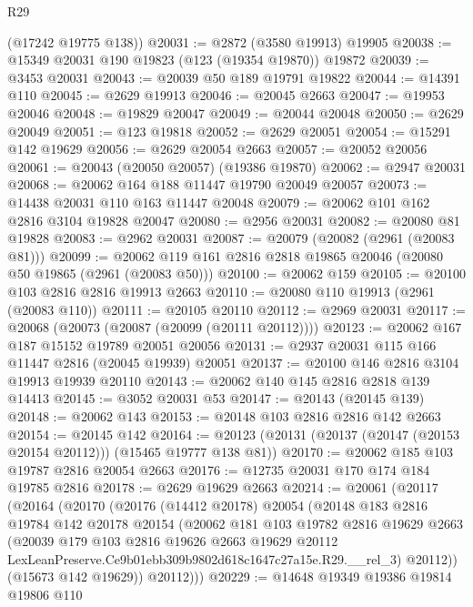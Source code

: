 \begin{lexlean}{R29}
\begin{coremodule}
      (@17242 @19775 @138))
@20031 := @2872 (@3580 @19913) @19905
@20038 := @15349 @20031 @190 @19823 (@123 (@19354 @19870)) @19872
@20039 := @3453 @20031
@20043 := @20039 @50 @189 @19791 @19822
@20044 := @14391 @110
@20045 := @2629 @19913
@20046 := @20045 @2663
@20047 := @19953 @20046
@20048 := @19829 @20047
@20049 := @20044 @20048
@20050 := @2629 @20049
@20051 := @123 @19818
@20052 := @2629 @20051
@20054 := @15291 @142 @19629
@20056 := @2629 @20054 @2663
@20057 := @20052 @20056
@20061 := @20043 (@20050 @20057) (@19386 @19870)
@20062 := @2947 @20031
@20068 := @20062 @164 @188 @11447 @19790 @20049 @20057
@20073 := @14438 @20031 @110 @163 @11447 @20048
@20079 := @20062 @101 @162 @2816 @3104 @19828 @20047
@20080 := @2956 @20031
@20082 := @20080 @81 @19828
@20083 := @2962 @20031
@20087 := @20079 (@20082 (@2961 (@20083 @81)))
@20099 := @20062 @119 @161 @2816 @2818 @19865 @20046 (@20080 @50 @19865 (@2961 (@20083 @50)))
@20100 := @20062 @159
@20105 := @20100 @103 @2816 @2816 @19913 @2663
@20110 := @20080 @110 @19913 (@2961 (@20083 @110))
@20111 := @20105 @20110
@20112 := @2969 @20031
@20117 := @20068 (@20073 (@20087 (@20099 (@20111 @20112))))
@20123 := @20062 @167 @187 @15152 @19789 @20051 @20056
@20131 := @2937 @20031 @115 @166 @11447 @2816 (@20045 @19939) @20051
@20137 := @20100 @146 @2816 @3104 @19913 @19939 @20110
@20143 := @20062 @140 @145 @2816 @2818 @139 @14413
@20145 := @3052 @20031 @53
@20147 := @20143 (@20145 @139)
@20148 := @20062 @143
@20153 := @20148 @103 @2816 @2816 @142 @2663
@20154 := @20145 @142
@20164 := @20123 (@20131 (@20137 (@20147 (@20153 @20154 @20112))) (@15465 @19777 @138 @81))
@20170 := @20062 @185 @103 @19787 @2816 @20054 @2663
@20176 := @12735 @20031 @170 @174 @184 @19785 @2816
@20178 := @2629 @19629 @2663
@20214 := @20061
    (@20117
      (@20164
        (@20170
          (@20176
            (@14412 @20178)
            @20054
            (@20148
              @183
              @2816
              @19784
              @142
              @20178
              @20154
              (@20062
                @181
                @103
                @19782
                @2816
                @19629
                @2663
                (@20039
                  @179
                  @103
                  @2816
                  @19626
                  @2663
                  @19629
                  @20112
                  LexLeanPreserve.Ce9b01ebb309b9802d618c1647c27a15e.R29.__rel_3)
                @20112))
            (@15673 @142 @19629))
          @20112)))
@20229 := @14648
    @19349
    @19386
    @19814
    @19806
    @110

\end{coremodule}
\end{lexlean}
